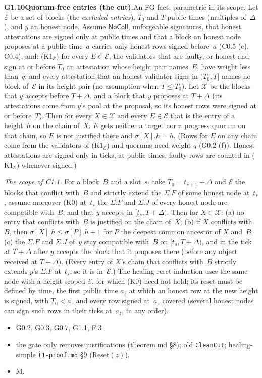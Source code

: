 \documentclass{article}
\newcommand{\dagnode}[6]{%
\par\medskip\noindent\textbf{#1\enspace #2.}\enspace #3
\begin{itemize}[leftmargin=2.2em,itemsep=0pt,topsep=2pt]
\item[\emph{Uses}] #4
\item[\emph{Evid.}] #5
\item[\emph{Task}] #6
\end{itemize}}
\begin{document}
\dagnode{G1.10}{Quorum-free entries (the cut)}{An FG fact, parametric in
its scope.  Let $\mathcal E$ be a set of blocks (the \emph{excluded entries}),
$T_0$ and $T$ public times (multiples of~$\Delta$), and $y$ an honest node.
Assume $\mathsf{NoColl}$, unforgeable signatures, that honest attestations are
signed only at public times and that a block an honest node proposes at a
public time~$a$ carries only honest rows signed before~$a$ (C0.5 (c), C0.4),
and:
($\mathrm K1_{\mathcal E}$) for every $E\in\mathcal E$, the validators that are
faulty, or honest and sign at or before $T_0$ an attestation whose height pair
names~$E$, have weight less than~$q$; and every attestation that an honest
validator signs in $(T_0,T]$ names no block of~$\mathcal E$ in its height pair
(no assumption when $T\leq T_0$).
Let $\mathcal X$ be the blocks that $y$ accepts before $T+\Delta$, and a block
that $y$ proposes at $T+\Delta$ (its attestations come from $y$'s pool at the
proposal, so its honest rows were signed at or before~$T$).  Then for every
$X\in\mathcal X$ and every $E\in\mathcal E$ that is the entry of a height~$h$ on
the chain of~$X$: $E$ gets neither a target nor a progress quorum on that chain,
so $E$ is not justified there and $\sigma[X].h=h$.  (Rows for $E$ on any chain
come from the validators of ($\mathrm K1_{\mathcal E}$) and quorums need weight
$q$ (G0.2 (f)).  Honest attestations are signed only in ticks, at public times;
faulty rows are counted in ($\mathrm K1_{\mathcal E}$) whenever signed.)

\emph{The scope of C1.1.}  For a block~$B$ and a slot~$s$, take $T_0=t_{s+1}+\Delta$
and $\mathcal E$ the blocks that conflict with~$B$ and strictly extend the
$\Sigma.F$ of some honest node at~$t_s$; assume moreover (K0) at~$t_s$ the
$\Sigma.F$ and $\Sigma.J$ of every honest node are compatible with~$B$, and that
$y$ accepts in $[t_s,T+\Delta)$.  Then for $X\in\mathcal X$: (a) no entry that
conflicts with~$B$ is justified on the chain of~$X$; (b) if $X$ conflicts
with~$B$, then $\sigma[X].h\leq\sigma[P].h+1$ for $P$ the deepest common ancestor
of $X$ and~$B$; (c) the $\Sigma.F$ and $\Sigma.J$ of~$y$ stay compatible with~$B$
on $[t_s,T+\Delta)$, and in the tick at $T+\Delta$ after $y$ accepts the block
that it proposes there (before any object received at $T+\Delta$).  (Every
entry of $X$'s chain that conflicts with~$B$ strictly extends $y$'s $\Sigma.F$
at~$t_s$, so it is in~$\mathcal E$.)  The healing reset induction uses the same
node with a height-scoped $\mathcal E$, for which (K0) need not hold; its reset
must be defined by time, the first public time $a_z$ at which an honest row at
the new height is signed, with $T_0<a_z$ and every row signed at~$a_z$ covered
(several honest nodes can sign such rows in their ticks at~$a_z$, in any order).}
{G0.2, G0.3, G0.7, G1.1, F.3}{the gate only removes justifications
(theorem.md \S8); old \texttt{CleanCut}; healing-simple \texttt{t1-proof.md}
\S9 (\textsf{Reset}$(z)$).}{M.}
\end{document}

